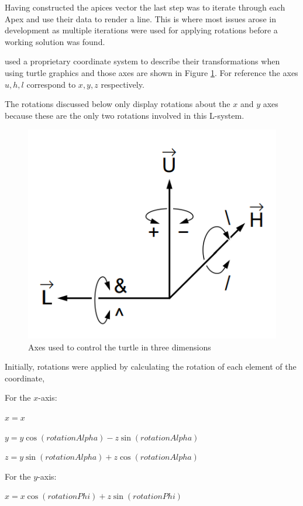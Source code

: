 \documentclass[final]{cmpreport}
\begin{document}
Having constructed the apices vector the last step was to iterate through each Apex and use their 
data to render a line. This is where most issues arose in development as multiple iterations were 
used for applying rotations before a working solution was found.

\cite{prusinkiewicz1996systems} used a proprietary coordinate system to describe their transformations 
when using turtle graphics and those axes are shown in Figure \ref{fig:uhl-coords}. For reference 
the axes $u, h, l$ correspond to $x, y, z$ respectively. 

The rotations discussed below only display rotations about the $x$ and $y$ axes because these 
are the only two rotations involved in this L-system.

\begin{figure}[ht]
    \includegraphics[scale=0.4]{uhl-coords.PNG} 
    \centering
    \captionsetup{justification=centering}
    \caption{Axes used to control the turtle in three dimensions}
    \label{fig:uhl-coords}
\end{figure}

\pagebreak
Initially, rotations were applied by calculating the rotation of each element of the coordinate,

For the $x$-axis:

$x = x$

$y = y\cos(rotationAlpha) - z\sin(rotationAlpha)$

$z = y\sin(rotationAlpha) + z\cos(rotationAlpha)$

For the $y$-axis:

$x = x\cos(rotationPhi) + z\sin(rotationPhi)$
\end{document}
